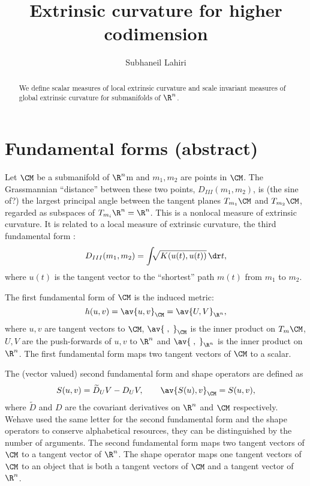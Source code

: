 \documentclass[12pt]{article}
\begin{document}
\title{Extrinsic curvature for higher codimension}%
\author{Subhaneil Lahiri}%
\maketitle
\begin{abstract}
  We define scalar measures of local extrinsic curvature and scale invariant measures of global extrinsic curvature for submanifolds of $\R^n$.
\end{abstract}

\section{Fundamental forms (abstract)}\label{sec:fundforms}

Let $\CM$ be a submanifold of $\R^n$m and $m_1,m_2$ are points in $\CM$.
The Grassmannian ``distance'' between these two points, $D_{III}(m_1,m_2)$, is (the sine of?) the largest principal angle between the tangent planes $T_{m_1}\CM$ and $T_{m_2}\CM$, regarded as subspaces of $T_{m_i}\R^n = \R^n$.
This is a nonlocal measure of extrinsic curvature.
It is related to a local measure of extrinsic curvature, the third fundamental form \cite{clarkson2008tighter}:
%
\begin{equation}\label{eq:grassmannian_dist}
  D_{III}(m_1,m_2) = \int \!\!\! \sqrt{K(u(t),u(t))} \, \dr t,
\end{equation}
%
where $u(t)$ is the tangent vector to the ``shortest'' path $m(t)$ from $m_1$ to $m_2$.

The first fundamental form of $\CM$ is the induced metric:
%
\begin{equation}\label{eq:first_fund}
  h(u,v) = \av{u,v}_\CM = \av{U,V}_{\R^n},
\end{equation}
%
where $u,v$ are tangent vectors to $\CM$, $\av{\;,\;}_\CM$ is the inner product on $T_{m}\CM$, $U,V$ are the push-forwards of $u,v$ to $\R^n$ and $\av{\;,\;}_{\R^n}$ is the inner product on $\R^n$.
The first fundamental form maps two tangent vectors of $\CM$ to a scalar.

The (vector valued) second fundamental form and shape operators are defined as \cite{gallot1990riemannian}
%
\begin{equation}\label{eq:second fund}
  S(u,v) = \widetilde{D}_U V - D_U V,
  \qquad \av{S(u),v}_\CM = S(u,v), 
\end{equation}
%
where $\widetilde{D}$ and $D$ are the covariant derivatives on $\R^n$ and $\CM$ respectively.
 Wehave used the same letter for the second fundamental form and the shape operators to conserve alphabetical resources, they can be distinguished by the number of arguments.
The second fundamental form maps two tangent vectors of $\CM$ to a tangent vector of $\R^n$.
The shape operator maps one tangent vectors of $\CM$ to an object that is both a tangent vectors of $\CM$ and a tangent vector of $\R^n$.
\end{document}
